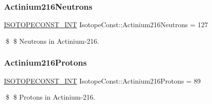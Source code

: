 \subsubsection{\texorpdfstring{Actinium216\+Neutrons}{Actinium216Neutrons}}
{\footnotesize\ttfamily \mbox{\hyperlink{group___isotope_const-_macros_ga5f18360b3e99483a35c32d789e62621c}{I\+S\+O\+T\+O\+P\+E\+C\+O\+N\+S\+T\+\_\+\+I\+NT}} Isotope\+Const\+::\+Actinium216\+Neutrons = 127}

\$ \$ Neutrons in Actinium-\/216. \mbox{\label{group___isotope_const-_actinium-_ac216_ga7cfec647dc089a8136d7b1a391149b4d}} 
\subsubsection{\texorpdfstring{Actinium216\+Protons}{Actinium216Protons}}
{\footnotesize\ttfamily \mbox{\hyperlink{group___isotope_const-_macros_ga5f18360b3e99483a35c32d789e62621c}{I\+S\+O\+T\+O\+P\+E\+C\+O\+N\+S\+T\+\_\+\+I\+NT}} Isotope\+Const\+::\+Actinium216\+Protons = 89}

\$ \$ Protons in Actinium-\/216. 